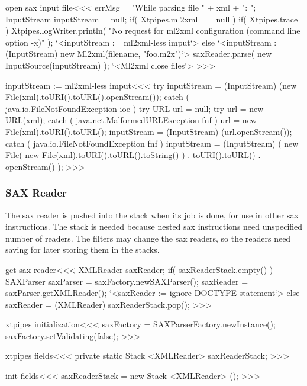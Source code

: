 \documentclass{article}
\begin{document}
{\<open sax input file\><<<
errMsg = "While parsing file " + xml + ": ";
InputStream inputStream = null;
if( Xtpipes.ml2xml == null ){
   if( Xtpipes.trace ){
       Xtpipes.logWriter.println(
         "No request for ml2xml configuration (command line option -x)" );
   }
   `<inputStream := ml2xml-less imput`>
} else {
   `<inputStream := (InputStream) new Ml2xml(filename, "foo.m2x")`>
}
saxReader.parse( new InputSource(inputStream) );
`<Ml2xml close files`>
>>>

\<inputStream := ml2xml-less imput\><<<
try{
    inputStream = (InputStream) (new File(xml).toURI().toURL().openStream());
} catch ( java.io.FileNotFoundException ioe ){
    try{
       URL url = null;
       try {
           url = new URL(xml);
       } catch ( java.net.MalformedURLException fnf ){
           url = new File(xml).toURI().toURL();
       }
       inputStream = (InputStream) (url.openStream());
    } catch ( java.io.FileNotFoundException fnf ){
        inputStream = (InputStream)
           (
              new File( new File(xml).toURI().toURL().toString() )
              . toURI().toURL()
              . openStream()
           );
}   }
>>>





\subsubsection{SAX Reader}

The sax reader is pushed into the stack when its job is done, for
use in other sax instructions.  The stack is needed because nested sax
instructions need unspecified number of readers. The filters may
change the sax readers, so the readers need saving for later storing
them in the stacks.

\<get sax reader\><<<
XMLReader saxReader;
if( saxReaderStack.empty() ){
   SAXParser saxParser = saxFactory.newSAXParser();
   saxReader = saxParser.getXMLReader();
   `<saxReader := ignore DOCTYPE statement`>
} else {
   saxReader = (XMLReader) saxReaderStack.pop();
}
>>>




\<xtpipes initialization\><<<
saxFactory = SAXParserFactory.newInstance();
saxFactory.setValidating(false);
>>>

\<xtpipes fields\><<<
private static Stack <XMLReader> saxReaderStack;
>>>


\<init fields\><<<
saxReaderStack = new Stack <XMLReader> ();
>>>

}
\end{document}
